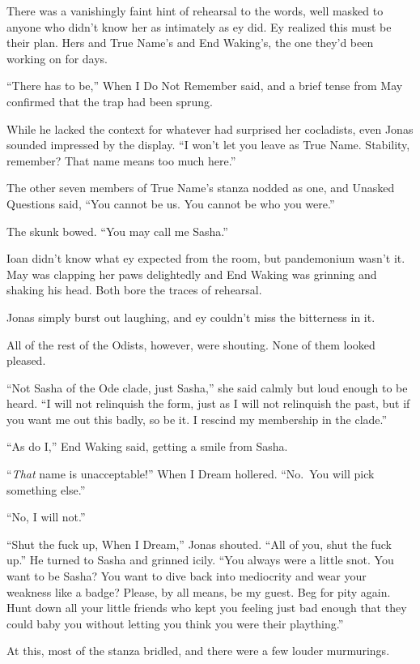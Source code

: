 There was a vanishingly faint hint of rehearsal to the words, well masked to anyone who didn't know her as intimately as ey did. Ey realized this must be their plan. Hers and True Name's and End Waking's, the one they'd been working on for days.

``There has to be,'' When I Do Not Remember said, and a brief tense from May confirmed that the trap had been sprung.

While he lacked the context for whatever had surprised her cocladists, even Jonas sounded impressed by the display. ``I won't let you leave as True Name. Stability, remember? That name means too much here.''

The other seven members of True Name's stanza nodded as one, and Unasked Questions said, ``You cannot be us. You cannot be who you were.''

The skunk bowed. ``You may call me Sasha.''

Ioan didn't know what ey expected from the room, but pandemonium wasn't it. May was clapping her paws delightedly and End Waking was grinning and shaking his head. Both bore the traces of rehearsal.

Jonas simply burst out laughing, and ey couldn't miss the bitterness in it.

All of the rest of the Odists, however, were shouting. None of them looked pleased.

``Not Sasha of the Ode clade, just Sasha,'' she said calmly but loud enough to be heard. ``I will not relinquish the form, just as I will not relinquish the past, but if you want me out this badly, so be it. I rescind my membership in the clade.''

``As do I,'' End Waking said, getting a smile from Sasha.

``\emph{That} name is unacceptable!'' When I Dream hollered. ``No.~You will pick something else.''

``No, I will not.''

``Shut the fuck up, When I Dream,'' Jonas shouted. ``All of you, shut the fuck up.'' He turned to Sasha and grinned icily. ``You always were a little snot. You want to be Sasha? You want to dive back into mediocrity and wear your weakness like a badge? Please, by all means, be my guest. Beg for pity again. Hunt down all your little friends who kept you feeling just bad enough that they could baby you without letting you think you were their plaything.''

At this, most of the stanza bridled, and there were a few louder murmurings.

